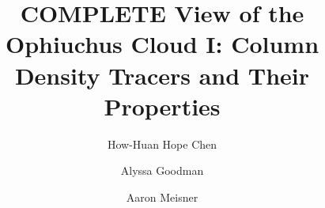 \documentclass{emulateapj}
\begin{document}

\title{COMPLETE View of the Ophiuchus Cloud I: Column Density Tracers and Their
Properties}



\author{How-Huan Hope Chen}
 
\author{Alyssa Goodman}
 
\author{Aaron Meisner}




\end{document}
